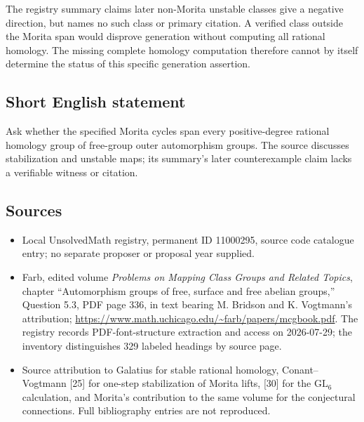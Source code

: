 \documentclass[11pt]{article}
\begin{document}
The registry summary claims later non-Morita unstable classes give a negative direction, but names no such class or primary citation. A verified class outside the Morita span would disprove generation without computing all rational homology. The missing complete homology computation therefore cannot by itself determine the status of this specific generation assertion.
\subsection{Short English statement}
Ask whether the specified Morita cycles span every positive-degree rational homology group of free-group outer automorphism groups. The source discusses stabilization and unstable maps; its summary's later counterexample claim lacks a verifiable witness or citation.
\subsection{Sources}
\begin{itemize}
\item Local UnsolvedMath registry, permanent ID 11000295, source code catalogue entry; no separate proposer or proposal year supplied.
\item Farb, edited volume \emph{Problems on Mapping Class Groups and Related Topics}, chapter ``Automorphism groups of free, surface and free abelian groups,'' Question 5.3, PDF page 336, in text bearing M. Bridson and K. Vogtmann's attribution; \url{https://www.math.uchicago.edu/~farb/papers/mcgbook.pdf}. The registry records PDF-font-structure extraction and access on 2026-07-29; the inventory distinguishes 329 labeled headings by source page.
\item Source attribution to Galatius for stable rational homology, Conant--Vogtmann [25] for one-step stabilization of Morita lifts, [30] for the $\mathrm{GL}_6$ calculation, and Morita's contribution to the same volume for the conjectural connections. Full bibliography entries are not reproduced.
\end{itemize}
\end{document}

